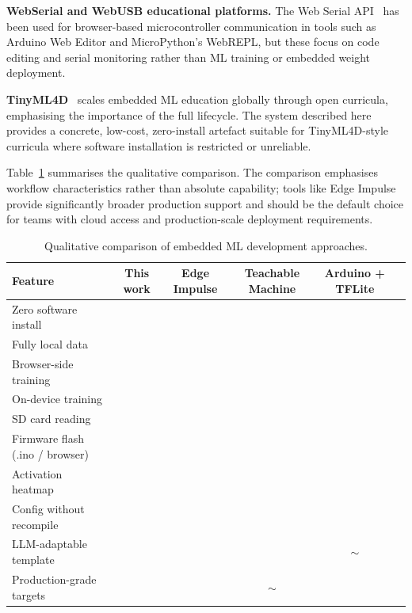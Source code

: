 \documentclass[11pt]{article}
\newcommand{\yes}{\ding{51}}
\newcommand{\no}{\ding{55}}
\newcommand{\partmark}{$\sim$}
\begin{document}
\textbf{WebSerial and WebUSB educational platforms.} The Web Serial
API~\cite{w3cserial} has been used for browser-based microcontroller communication in
tools such as Arduino Web Editor and MicroPython's WebREPL, but these focus on code
editing and serial monitoring rather than ML training or embedded weight deployment.

\textbf{TinyML4D}~\cite{plancher2024tinymld} scales embedded ML education globally
through open curricula, emphasising the importance of the full lifecycle. The system
described here provides a concrete, low-cost, zero-install artefact suitable for
TinyML4D-style curricula where software installation is restricted or unreliable.

Table~\ref{tab:platform} summarises the qualitative comparison. The comparison emphasises workflow characteristics rather than absolute capability; tools like Edge Impulse provide significantly broader production support and should be the default choice for teams with cloud access and production-scale deployment requirements.

\begin{table}[h]
\centering
\caption{Qualitative comparison of embedded ML development approaches.}
\label{tab:platform}
\begin{tabular}{@{}lccccc@{}}
\toprule
\textbf{Feature} & \textbf{This work} & \textbf{Edge Impulse} & \textbf{Teachable Machine} & \textbf{Arduino + TFLite} \\
\midrule
Zero software install    & \yes & \no  & \yes & \no  \\
Fully local data         & \yes & \no  & \no  & \yes \\
Browser-side training    & \yes & \no  & \yes & \no  \\
On-device training       & \yes & \no  & \no  & \no  \\
SD card reading          & \yes & \no  & \no  & \no  \\
Firmware flash (.ino / browser) & \yes & \yes  & \no  & \yes  \\
Activation heatmap       & \yes & \no  & \no  & \no  \\
Config without recompile & \yes & \yes & \yes & \no  \\
LLM-adaptable template   & \yes & \no  & \no  & \partmark \\
Production-grade targets & \no  & \yes & \partmark & \yes \\
\bottomrule
\end{tabular}
\end{table}
\end{document}
